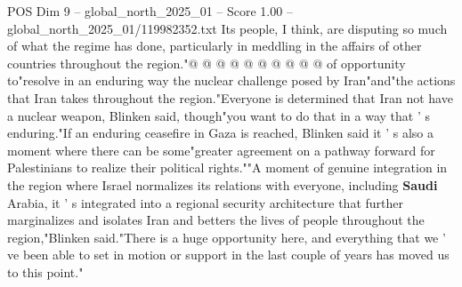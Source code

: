 \begin{textsample}{POS Dim 9 – global\_north\_2025\_01 – Score 1.00 – global\_north\_2025\_01/119982352.txt}
Its people, I think, are disputing so much of what the regime has done, particularly in meddling in the affairs of other countries throughout the region."@ @ @ @ @ @ @ @ @ @ of opportunity to"resolve in an enduring way the nuclear challenge posed by Iran"and"the actions that Iran takes throughout the region."Everyone is determined that Iran not have a nuclear weapon, Blinken said, though"you want to do that in a way that ' s enduring."If an enduring ceasefire in Gaza is reached, Blinken said it ' s also a moment where there can be some"greater agreement on a pathway forward for Palestinians to realize their political rights.""A moment of genuine integration in the region where Israel normalizes its relations with everyone, including \textbf{Saudi} Arabia, it ' s integrated into a regional security architecture that further marginalizes and isolates Iran and betters the lives of people throughout the region,"Blinken said."There is a huge opportunity here, and everything that we ' ve been able to set in motion or support in the last couple of years has moved us to this point."

\end{textsample}
